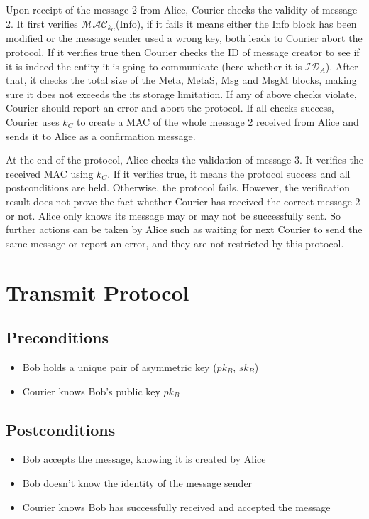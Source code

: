 Upon receipt of the message 2 from Alice, Courier checks the validity of message 2. It first verifies $ \mathcal{MAC}_{k_C} $(Info), if it fails it means either the Info block has been modified or the message sender used a wrong key, both leads to Courier abort the protocol. If it verifies true then Courier checks the ID of message creator to see if it is indeed the entity it is going to communicate (here whether it is $ \mathcal{ID}_A $). After that, it checks the total size of the Meta, MetaS, Msg and MsgM blocks, making sure it does not exceeds the its storage limitation. If any of above checks violate, Courier should report an error and abort the protocol. If all checks success, Courier uses $ k_C $ to create a MAC of the whole message 2 received from Alice and sends it to Alice as a confirmation message.

At the end of the protocol, Alice checks the validation of message 3. It verifies the received MAC using $ k_C $. If it verifies true, it means the protocol success and all postconditions are held. Otherwise, the protocol fails. However, the verification result does not prove the fact whether Courier has received the correct message 2 or not. Alice only knows its message may or may not be successfully sent. So further actions can be taken by Alice such as waiting for next Courier to send the same message or report an error, and they are not restricted by this protocol.


\pagebreak
\section{Transmit Protocol}
\subsection{Preconditions}
\begin{itemize}
\item Bob holds a unique pair of asymmetric key ($pk_B$, $sk_B$)
\item Courier knows Bob's public key $pk_B$
\end{itemize}
\subsection{Postconditions}
\begin{itemize}
\item Bob accepts the message, knowing it is created by Alice
\item Bob doesn't know the identity of the message sender
\item Courier knows Bob has successfully received and accepted the message
\end{itemize}
